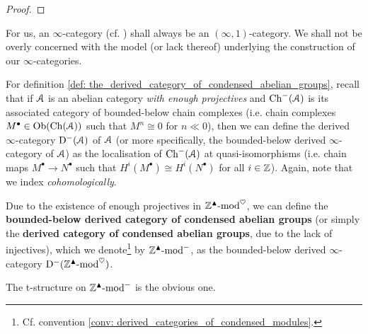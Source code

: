                 \begin{proof}
                    
                \end{proof}
            \begin{convention}
                For us, an $\infty$-category (cf. \cite[Chapters 1-3]{HTT}) shall always be an $(\infty, 1)$-category. We shall not be overly concerned with the model (or lack thereof) underlying the construction of our $\infty$-categories. 
            \end{convention}
            \begin{remark}
                For definition \ref{def: the_derived_category_of_condensed_abelian_groups}, recall that if $\mathcal{A}$ is an abelian category \textit{with enough projectives} and $\mathrm{Ch}^-(\mathcal{A})$ is its associated category of bounded-below chain complexes (i.e. chain complexes $M^{\bullet} \in \mathrm{Ob}(\mathrm{Ch}(\mathcal{A}))$ such that $M^n \cong 0$ for $n \ll 0$), then we can define the derived $\infty$-category $\mathrm{D}^-(\mathcal{A})$ of $\mathcal{A}$ (or more specifically, the bounded-below derived $\infty$-category of $\mathcal{A}$) as the localisation of $\mathrm{Ch}^-(\mathcal{A})$ at quasi-isomorphisms (i.e. chain maps $M^{\bullet} \to N^{\bullet}$ such that $H^i(M^{\bullet}) \cong H^i(N^{\bullet})$ for all $i \in \mathbb{Z}$). Again, note that we index \textit{cohomologically}. 
            \end{remark}
            \begin{definition} \label{def: the_derived_category_of_condensed_abelian_groups}
                Due to the existence of enough projectives in $\mathbb{Z}^{\blacktriangle}\text{-}\mathrm{mod}^{\heartsuit}$, we can define the \textbf{bounded-below derived category of condensed abelian groups} (or simply the \textbf{derived category of condensed abelian groups}, due to the lack of injectives), which we denote\footnote{Cf. convention \ref{conv: derived_categories_of_condensed_modules}.} by $\mathbb{Z}^{\blacktriangle}\text{-}\mathrm{mod}^-$, as the bounded-below derived $\infty$-category $\mathrm{D}^-(\mathbb{Z}^{\blacktriangle}\text{-}\mathrm{mod}^{\heartsuit})$.
                
                The t-structure on $\mathbb{Z}^{\blacktriangle}\text{-}\mathrm{mod}^-$ is the obvious one.
            \end{definition}
